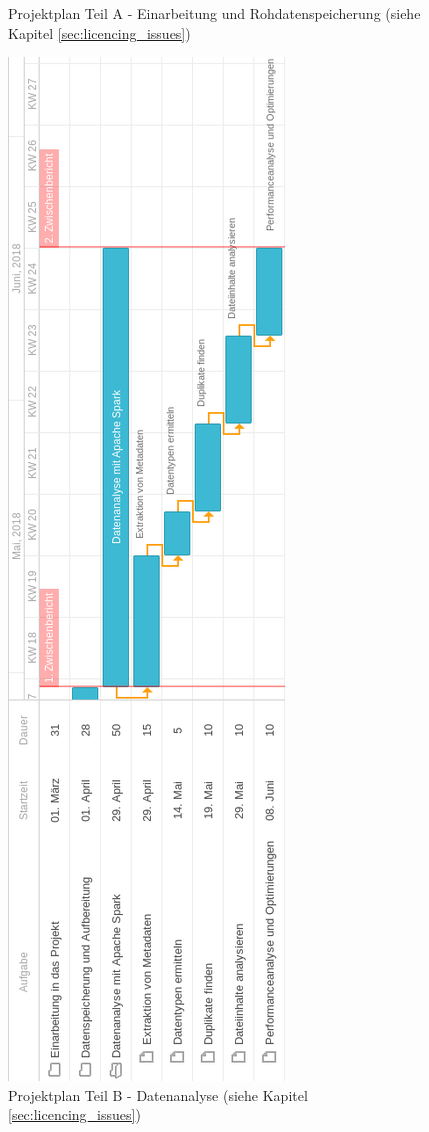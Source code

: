 \begin{figure}[p]
  \caption{Projektplan Teil A - Einarbeitung und Rohdatenspeicherung (siehe Kapitel \ref{sec:licencing_issues})}
  \label{fig:ganttA}
\end{figure}

\begin{figure}[p]
  \centering
  \includegraphics[width=\textwidth,height=\textheight,keepaspectratio]{./resource/ganttB.png}
  \caption{Projektplan Teil B - Datenanalyse (siehe Kapitel \ref{sec:licencing_issues})}
  \label{fig:ganttB}
\end{figure}

